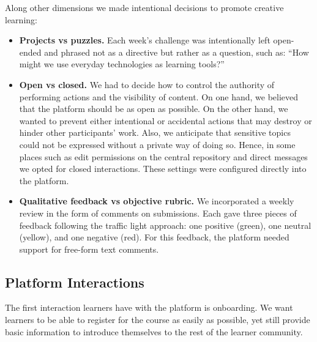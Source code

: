 \documentclass[12pt,twoside]{mitthesis}
\begin{document}
{Along other dimensions we made intentional decisions to promote creative learning:
\begin{itemize}
\item \textbf{Projects vs puzzles.} Each week's challenge was intentionally left open-ended and phrased not as a directive but rather as a question, such as: ``How might we use everyday technologies as learning tools?''
\item \textbf{Open vs closed.} We had to decide how to control the authority of performing actions and the visibility of content. On one hand, we believed that the platform should be as open as possible. On the other hand, we wanted to prevent either intentional or accidental actions that may destroy or hinder other participants' work. Also, we anticipate that sensitive topics could not be expressed without a private way of doing so. Hence, in some places such as edit permissions on the central repository and direct messages we opted for closed interactions. These settings were configured directly into the platform.
\item \textbf{Qualitative feedback vs objective rubric.} We incorporated a weekly review in the form of comments on submissions. Each gave three pieces of feedback following the traffic light approach: one positive (green), one neutral (yellow), and one negative (red). For this feedback, the platform needed support for free-form text comments.
\end{itemize}
}

\subsection{Platform Interactions}

The first interaction learners have with the platform is onboarding. We want learners to be able to register for the course as easily as possible, yet still provide basic information to introduce themselves to the rest of the learner community.
\end{document}
